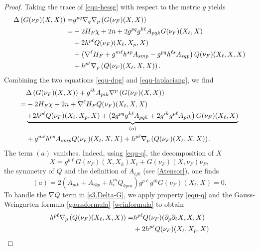 \documentclass[11pt,reqno]{amsart}
\theoremstyle{definition}
\theoremstyle{remark}
\numberwithin{equation}{section}
\begin{document}
\begin{proof}
		Taking the trace of \eqref{equ-hessg} with respect to the metric $g$ yields
		\begin{align}
			\Delta\left( G(\nu_F)(X,X) \right) 
			=& g^{pq}\nabla_q\nabla_p\left( G(\nu_F)(X,X) \right) \notag\\
			=& -2 H_F \chi + 2n + 2g^{pq}g^{k\ell} A_{pqk}G(\nu_F)(X_{\ell},X) \nonumber\\
			&+ 2h^{p\ell}Q(\nu_F)(X_{\ell},X_p,X)\notag\\
			&+\left( \nabla^{\ell}H_F + g^{m\ell}h^{sp} A_{smp} - g^{pq}h^{\ell s}A_{sqp} \right)Q(\nu_F)(X_{\ell},X,X) \notag\\
			&+h^{p\ell}\nabla_p\left( Q(\nu_F)(X_{\ell},X,X) \right). \label{equ-laplaciang}
		\end{align}
		Combining the two equations \eqref{equ-dpg} and \eqref{equ-laplaciang}, we find
		\begin{align}
			&\Delta\left( G(\nu_F)(X,X) \right) + g^{ik}A_{pik}\nabla^p\left( G(\nu_F)(X,X) \right) \notag\\
			=& -2H_F \chi + 2n + \nabla^{\ell}H_F Q(\nu_F)(X_{\ell},X,X) \nonumber\\
			& \underbrace{+ 2 h^{p\ell}Q(\nu_F)(X_{\ell},X_p,X) +\left( 2g^{pq}g^{k\ell}A_{pqk} + 2g^{ik}g^{p\ell}A_{pik} \right)G(\nu_F)(X_{\ell},X) }_{(a)} \nonumber\\
			& + g^{m\ell}h^{ps}A_{smp} Q(\nu_F)(X_{\ell},X,X) + h^{p\ell}\nabla_p\left( Q(\nu_F)(X_{\ell},X,X) \right). \label{s3.Delta-G}
		\end{align}
		The term $(a)$ vanishes. Indeed, using \eqref{equ-q}, the decomposition of $X$
		\begin{equation*}
			X=g^{k\ell}G(\nu_F)(X,X_k)X_{\ell}+G(\nu_F)(X,\nu_F)\nu_F,
		\end{equation*}
		the symmetry of $Q$ and the definition of $A_{ijk}$ (see \eqref{Atensor}), one finds
		\begin{equation}\label{s3.a-vanish}
			(a) = 2\left( A_{pik} + A_{ikp} + h_{i}^mQ_{kpm} \right) g^{p\ell}g^{ik}G(\nu_F)(X_{\ell},X) =0.
		\end{equation}
	To handle the $\nabla Q$ term in \eqref{s3.Delta-G}, we apply property \eqref{equ-q} and the Gauss-Weingarten formula \eqref{gaussformula}  \eqref{weinformula} to obtain
		\begin{align}
			h^{p\ell}\nabla_p\left( Q(\nu_F)(X_{\ell},X,X) \right) =& h^{p\ell}Q(\nu_F)(\partial_p\partial_{\ell} X,X,X) \notag\\
			&+ 2h^{p\ell}Q(\nu_F)(X_{\ell},X_p,X) \notag\\

\end{align}
\end{proof}
\end{document}
